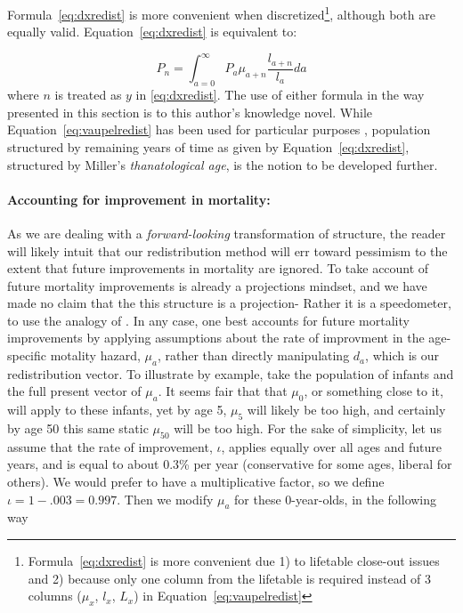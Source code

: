 Formula~\eqref{eq:dxredist} is more convenient when 
discretized\footnote{Formula~\eqref{eq:dxredist} is more convenient due 1) to lifetable 
close-out issues and 2) because only one column from the lifetable is required instead 
of 3 columns ($\mu_x$, $l_x$, $L_x$) in
Equation~\eqref{eq:vaupelredist} }, although both are equally valid.
Equation~\ref{eq:dxredist} is equivalent to:

\begin{equation}
P_n = \int _{a=0} ^\infty P_a \mu_{a+n} \frac{l_{a+n}}{l_a} da
\end{equation}
where $n$ is treated as $y$ in \ref{eq:dxredist}.
The use of either formula in the way presented in this section is to this
author's knowledge novel. While Equation~\eqref{eq:vaupelredist} has
been used for particular purposes \citep{miller2001increasing}, population
structured by remaining years of time as given by Equation~\eqref{eq:dxredist}, structured
by Miller's \textit{thanatological age}, is the notion
to be developed further.

\paragraph{Accounting for improvement in mortality: }
As we are dealing with a \textit{forward-looking}\citep{sanderson2007new}
transformation of structure, the reader will likely intuit that our redistribution 
method will err toward pessimism to the extent that
future improvements in mortality are ignored. To take account of future
mortality improvements is already a projections mindset, and we have made no
claim that the this structure is a projection- Rather it is a speedometer, to
use the analogy of \citet{coale1972growth}. In any case, one best accounts for
future mortality improvements by applying assumptions about the rate of
improvment in the age-specific motality hazard, $\mu_a$, rather than directly
manipulating $d_a$, which is our redistribution vector. To illustrate by
example, take the population of infants and the full present vector of $\mu_a$. It seems fair that
that $\mu_0$, or something close to it, will apply to these infants, yet by age
5, $\mu_5$ will likely be too high, and certainly by age 50
this same static $\mu_50$ will be too high. For the sake of simplicity, let us assume that the
rate of improvement, $\iota$, applies equally over all ages and future years,
and is equal to about 0.3\% per year (conservative for some ages, liberal
for others). We would prefer to have a multiplicative factor, so we define
$\iota = 1-.003 = 0.997$. Then we modify $\mu_a$ for these 0-year-olds, in
the following way

